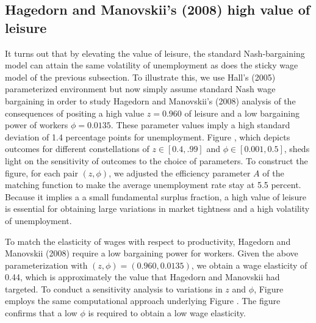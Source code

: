\subsection{Hagedorn and Manovskii's (2008) high value of leisure}
           \label{sec:FS_HagMan_simul}%
 It turns out that  by elevating the value of
leisure,
the standard Nash-bargaining model can attain the
same volatility of unemployment as does the sticky wage model of the previous subsection.
To illustrate this, we use  Hall's (2005) parameterized environment
but
now simply assume standard Nash wage bargaining in order to study
 Hagedorn and Manovskii's (2008) analysis of the consequences of
  positing a high value $z=0.960$ of leisure  and a low
bargaining power of workers  $\phi=0.0135$.
These parameter values imply a
high standard deviation of 1.4 percentage points for unemployment.
Figure , which depicts outcomes for different
constellations of $z\in [0.4, .99]$ and $\phi\in[0.001, 0.5]$, sheds light
 on the sensitivity of outcomes to  the choice of parameters.
To construct the figure, for each pair $(z,\phi)$, we adjusted the efficiency parameter $A$
of the matching function to make the average unemployment rate stay at
5.5 percent. Because it implies a
a small fundamental surplus fraction, a high value of leisure is essential for obtaining large variations in market tightness and a high volatility of unemployment.



To match the elasticity of wages with respect to productivity,
Hagedorn and Manovskii (2008) require a low bargaining power for workers.
Given the above parameterization with $(z,\phi)=(0.960, 0.0135)$,
we obtain a  wage elasticity
of 0.44, which  is approximately the value that
Hagedorn and Manovskii had targeted. To conduct a sensitivity analysis to variations in $z$ and $\phi$,
Figure 
employs   the same computational approach underlying Figure .
  The figure confirms
that  a low $\phi$ is required to obtain a low wage
elasticity.



